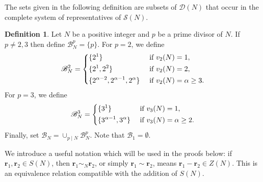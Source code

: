 \documentclass[12pt]{amsart}
\numberwithin{equation}{section}
\theoremstyle{plain}
\theoremstyle{definition}
\newtheorem{deff}[thm]{Definition}
\theoremstyle{remark}
\begin{document}
The sets given in the following definition are subsets of $\mathscr{D}(N)$ that occur in the complete system of representatives of $\mathscr{S}(N)$.
\begin{deff}
Let $N$ be a positive integer and $p$ be a prime divisor of $N$. If $p\neq2,3$ then define $\mathscr{B}_N^p=\{p\}$. For $p=2$, we define
\begin{equation*}
\mathscr{B}_N^2=\begin{dcases}
\{2^1\}  &\text{ if }v_2(N)=1,\\
\{2^1,2^2\}  &\text{ if }v_2(N)=2,\\
\{2^{\alpha-2},2^{\alpha-1},2^{\alpha}\}  &\text{ if }v_2(N)=\alpha\geq3.\\
\end{dcases}
\end{equation*}
For $p=3$, we define
\begin{equation*}
\mathscr{B}_N^3=\begin{dcases}
\{3^1\}  &\text{ if }v_3(N)=1,\\
\{3^{\alpha-1},3^{\alpha}\}  &\text{ if }v_3(N)=\alpha\geq2.\\
\end{dcases}
\end{equation*}
Finally, set $\mathscr{B}_N=\cup_{p\mid N}\mathscr{B}_N^p$. Note that $\mathscr{B}_1=\emptyset$.
\end{deff}
We introduce a useful notation which will be used in the proofs below: if $\mathbf{r}_1,\mathbf{r}_2\in S(N)$, then $\mathbf{r}_1\sim_N\mathbf{r}_2$, or simply $\mathbf{r}_1\sim\mathbf{r}_2$, means $\mathbf{r}_1-\mathbf{r}_2\in Z(N)$. This is an equivalence relation compatible with the addition of $S(N)$.
\end{document}
